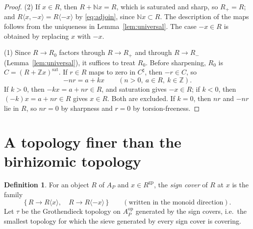 \documentclass[11pt]{article}
\newcommand{\N}{\mathbb N}
\newcommand{\Z}{\mathbb Z}
\newcommand{\gp}{\mathrm{gp}}
\newcommand{\sat}{\mathrm{sat}}
\theoremstyle{definition}
\newtheorem{definition}[theorem]{Definition}
\theoremstyle{remark}
\begin{document}
\begin{proof}
(2) If \(x\in R\), then \(R+\N x=R\), which is saturated and sharp, so
\(R_+=R\); and \(R\langle x,-x\rangle=R\langle -x\rangle\) by
\eqref{eq:adjoin}, since \(\N x\subset R\).  The description of the maps
follows from the uniqueness in Lemma~\ref{lem:universal}.  The case
\(-x\in R\) is obtained by replacing \(x\) with \(-x\).

(1) Since \(R\to R_0\) factors through \(R\to R_+\) and through \(R\to R_-\)
(Lemma~\ref{lem:universal}), it suffices to treat \(R_0\).  Before
sharpening, \(R_0\) is \(C=(R+\Z x)^{\sat}\).  If \(r\in R\) maps to zero in
\(C^\sharp\), then \(-r\in C\), so
\[
                   -nr=a+kx
       \qquad(n>0,\ a\in R,\ k\in\Z).
\]
If \(k>0\), then \(-kx=a+nr\in R\), and saturation gives \(-x\in R\);
if \(k<0\), then \((-k)x=a+nr\in R\) gives \(x\in R\).  Both are excluded.
If \(k=0\), then \(nr\) and \(-nr\) lie in \(R\), so \(nr=0\) by sharpness
and \(r=0\) by torsion-freeness.
\end{proof}

\section{A topology finer than the birhizomic topology}
\label{sec:tau}

\begin{definition}\label{def:tau}
For an object \(R\) of \(A_P\) and \(x\in R^{\gp}\), the \emph{sign cover}
of \(R\) at \(x\) is the family
\begin{equation}
             \{\,R\longrightarrow R\langle x\rangle,\quad
                    R\longrightarrow R\langle -x\rangle\,\}
             \qquad(\text{written in the monoid direction}).
                                                         \label{eq:binary}
\end{equation}
Let \(\tau\) be the Grothendieck topology on \(A_P^{\mathrm{op}}\) generated
by the sign covers, i.e.\ the smallest topology for which the sieve generated
by every sign cover is covering.
\end{definition}
\end{document}
